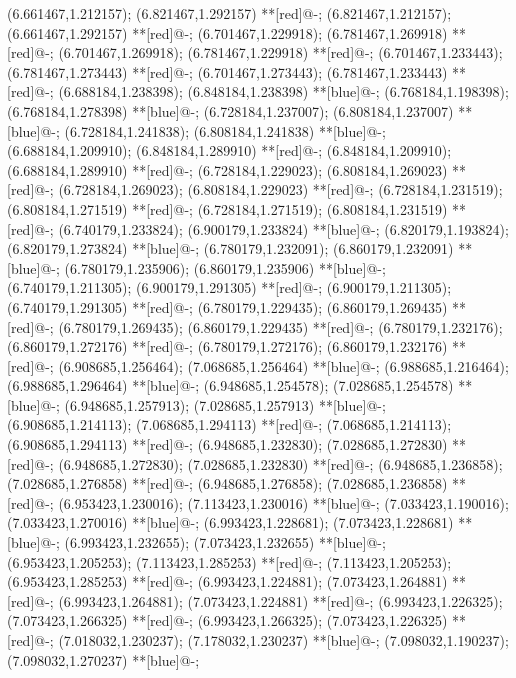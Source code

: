 (6.661467,1.212157); (6.821467,1.292157) **[red]@{-};
(6.821467,1.212157); (6.661467,1.292157) **[red]@{-};
(6.701467,1.229918); (6.781467,1.269918) **[red]@{-};
(6.701467,1.269918); (6.781467,1.229918) **[red]@{-};
(6.701467,1.233443); (6.781467,1.273443) **[red]@{-};
(6.701467,1.273443); (6.781467,1.233443) **[red]@{-};
(6.688184,1.238398); (6.848184,1.238398) **[blue]@{-};
(6.768184,1.198398); (6.768184,1.278398) **[blue]@{-};
(6.728184,1.237007); (6.808184,1.237007) **[blue]@{-};
(6.728184,1.241838); (6.808184,1.241838) **[blue]@{-};
(6.688184,1.209910); (6.848184,1.289910) **[red]@{-};
(6.848184,1.209910); (6.688184,1.289910) **[red]@{-};
(6.728184,1.229023); (6.808184,1.269023) **[red]@{-};
(6.728184,1.269023); (6.808184,1.229023) **[red]@{-};
(6.728184,1.231519); (6.808184,1.271519) **[red]@{-};
(6.728184,1.271519); (6.808184,1.231519) **[red]@{-};
(6.740179,1.233824); (6.900179,1.233824) **[blue]@{-};
(6.820179,1.193824); (6.820179,1.273824) **[blue]@{-};
(6.780179,1.232091); (6.860179,1.232091) **[blue]@{-};
(6.780179,1.235906); (6.860179,1.235906) **[blue]@{-};
(6.740179,1.211305); (6.900179,1.291305) **[red]@{-};
(6.900179,1.211305); (6.740179,1.291305) **[red]@{-};
(6.780179,1.229435); (6.860179,1.269435) **[red]@{-};
(6.780179,1.269435); (6.860179,1.229435) **[red]@{-};
(6.780179,1.232176); (6.860179,1.272176) **[red]@{-};
(6.780179,1.272176); (6.860179,1.232176) **[red]@{-};
(6.908685,1.256464); (7.068685,1.256464) **[blue]@{-};
(6.988685,1.216464); (6.988685,1.296464) **[blue]@{-};
(6.948685,1.254578); (7.028685,1.254578) **[blue]@{-};
(6.948685,1.257913); (7.028685,1.257913) **[blue]@{-};
(6.908685,1.214113); (7.068685,1.294113) **[red]@{-};
(7.068685,1.214113); (6.908685,1.294113) **[red]@{-};
(6.948685,1.232830); (7.028685,1.272830) **[red]@{-};
(6.948685,1.272830); (7.028685,1.232830) **[red]@{-};
(6.948685,1.236858); (7.028685,1.276858) **[red]@{-};
(6.948685,1.276858); (7.028685,1.236858) **[red]@{-};
(6.953423,1.230016); (7.113423,1.230016) **[blue]@{-};
(7.033423,1.190016); (7.033423,1.270016) **[blue]@{-};
(6.993423,1.228681); (7.073423,1.228681) **[blue]@{-};
(6.993423,1.232655); (7.073423,1.232655) **[blue]@{-};
(6.953423,1.205253); (7.113423,1.285253) **[red]@{-};
(7.113423,1.205253); (6.953423,1.285253) **[red]@{-};
(6.993423,1.224881); (7.073423,1.264881) **[red]@{-};
(6.993423,1.264881); (7.073423,1.224881) **[red]@{-};
(6.993423,1.226325); (7.073423,1.266325) **[red]@{-};
(6.993423,1.266325); (7.073423,1.226325) **[red]@{-};
(7.018032,1.230237); (7.178032,1.230237) **[blue]@{-};
(7.098032,1.190237); (7.098032,1.270237) **[blue]@{-};
